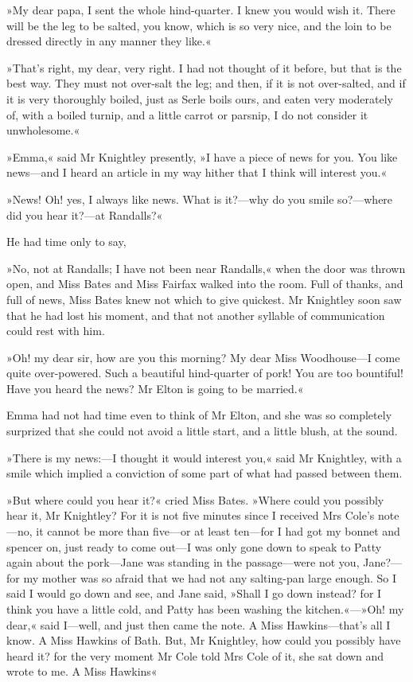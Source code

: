 »My dear papa, I sent the whole hind-quarter. I knew you would wish it. There will be the leg to be salted, you know, which is so very nice, and the loin to be dressed directly in any manner they like.«

»That's right, my dear, very right. I had not thought of it before, but that is the best way. They must not over-salt the leg; and then, if it is not over-salted, and if it is very thoroughly boiled, just as Serle boils ours, and eaten very moderately of, with a boiled turnip, and a little carrot or parsnip, I do not consider it unwholesome.«

»Emma,« said Mr Knightley presently, »I have a piece of news for you. You like news—and I heard an article in my way hither that I think will interest you.«

»News! Oh! yes, I always like news. What is it?—why do you smile so?—where did you hear it?—at Randalls?«

He had time only to say,

»No, not at Randalls; I have not been near Randalls,« when the door was thrown open, and Miss Bates and Miss Fairfax walked into the room. Full of thanks, and full of news, Miss Bates knew not which to give quickest. Mr Knightley soon saw that he had lost his moment, and that not another syllable of communication could rest with him.

»Oh! my dear sir, how are you this morning? My dear Miss Woodhouse—I come quite over-powered. Such a beautiful hind-quarter of pork! You are too bountiful! Have you heard the news? Mr Elton is going to be married.«

Emma had not had time even to think of Mr Elton, and she was so completely surprized that she could not avoid a little start, and a little blush, at the sound.

»There is my news:—I thought it would interest you,« said Mr Knightley, with a smile which implied a conviction of some part of what had passed between them.

»But where could you hear it?« cried Miss Bates. »Where could you possibly hear it, Mr Knightley? For it is not five minutes since I received Mrs Cole's note—no, it cannot be more than five—or at least ten—for I had got my bonnet and spencer on, just ready to come out—I was only gone down to speak to Patty again about the pork—Jane was standing in the passage—were not you, Jane?—for my mother was so afraid that we had not any salting-pan large enough. So I said I would go down and see, and Jane said, »Shall I go down instead? for I think you have a little cold, and Patty has been washing the kitchen.«—»Oh! my dear,« said I—well, and just then came the note. A Miss Hawkins—that's all I know. A Miss Hawkins of Bath. But, Mr Knightley, how could you possibly have heard it? for the very moment Mr Cole told Mrs Cole of it, she sat down and wrote to me. A Miss Hawkins\longdash«

